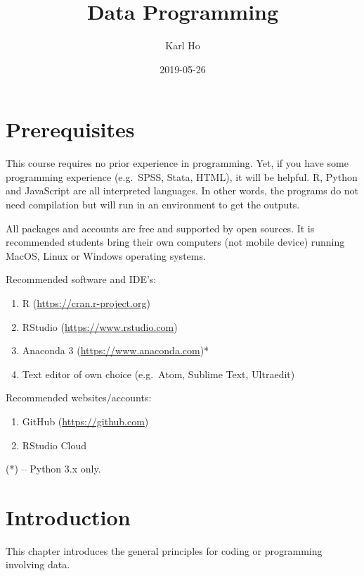 \documentclass[]{book}
\title{Data Programming}
\author{Karl Ho}
\date{2019-05-26}
\providecommand{\tightlist}{%
  \setlength{\itemsep}{0pt}\setlength{\parskip}{0pt}}
\begin{document}
\maketitle

{
\setcounter{tocdepth}{1}
\tableofcontents
}
\hypertarget{prerequisites}{%
\chapter{Prerequisites}\label{prerequisites}}

This course requires no prior experience in programming. Yet, if you have some programming experience (e.g.~SPSS, Stata, HTML), it will be helpful. R, Python and JavaScript are all interpreted languages. In other words, the programs do not need compilation but will run in an environment to get the outputs.

All packages and accounts are free and supported by open sources. It is recommended students bring their own computers (not mobile device) running MacOS, Linux or Windows operating systems.

Recommended software and IDE's:

\begin{enumerate}
\def\labelenumi{\arabic{enumi}.}
\tightlist
\item
  R (\url{https://cran.r-project.org})
\item
  RStudio (\url{https://www.rstudio.com})
\item
  Anaconda 3 (\url{https://www.anaconda.com})*
\item
  Text editor of own choice (e.g.~Atom, Sublime Text, Ultraedit)
\end{enumerate}

Recommended websites/accounts:

\begin{enumerate}
\def\labelenumi{\arabic{enumi}.}
\tightlist
\item
  GitHub (\url{https://github.com})
\item
  RStudio Cloud
\end{enumerate}

(*) -- Python 3.x only.

\hypertarget{intro}{%
\chapter{Introduction}\label{intro}}

This chapter introduces the general principles for coding or programming involving data.
\end{document}
